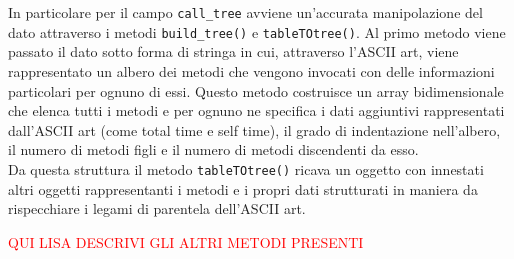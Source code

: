 	In particolare per il campo \texttt{call\_tree} avviene un'accurata manipolazione del dato attraverso i metodi \texttt{build\_tree()} e \texttt{tableTOtree()}. Al primo metodo viene  passato il dato sotto forma di stringa in cui, attraverso l'ASCII art, viene rappresentato un albero dei metodi che vengono invocati con delle informazioni particolari per ognuno di essi. Questo metodo costruisce un array bidimensionale che elenca tutti i metodi e per ognuno ne specifica i dati aggiuntivi rappresentati dall'ASCII art (come total time e self time), il grado di indentazione nell'albero, il numero di metodi figli e il numero di metodi discendenti da esso. \\ Da questa struttura il metodo \texttt{tableTOtree()} ricava un oggetto con innestati altri oggetti rappresentanti i metodi e i propri dati strutturati in maniera da rispecchiare i legami di parentela dell'ASCII art.


	\textcolor{red}{QUI LISA DESCRIVI GLI ALTRI METODI PRESENTI}

